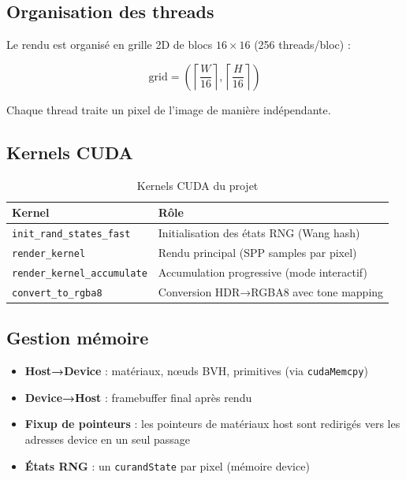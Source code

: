 \documentclass[12pt,a4paper]{article}
\begin{document}
\subsection{Organisation des threads}

Le rendu est organisé en grille 2D de blocs $16 \times 16$ (256 threads/bloc) :

\[
\text{grid} = \left(\left\lceil\frac{W}{16}\right\rceil, \left\lceil\frac{H}{16}\right\rceil\right)
\]

Chaque thread traite un pixel de l'image de manière indépendante.

\subsection{Kernels CUDA}

\begin{table}[H]
\centering
\begin{tabular}{lp{8cm}}
\toprule
\textbf{Kernel} & \textbf{Rôle} \\
\midrule
\texttt{init\_rand\_states\_fast}    & Initialisation des états RNG (Wang hash) \\
\texttt{render\_kernel}              & Rendu principal (SPP samples par pixel) \\
\texttt{render\_kernel\_accumulate}  & Accumulation progressive (mode interactif) \\
\texttt{convert\_to\_rgba8}          & Conversion HDR→RGBA8 avec tone mapping \\
\bottomrule
\end{tabular}
\caption{Kernels CUDA du projet}
\end{table}

\subsection{Gestion mémoire}

\begin{itemize}
    \item \textbf{Host→Device} : matériaux, nœuds BVH, primitives (via \texttt{cudaMemcpy})
    \item \textbf{Device→Host} : framebuffer final après rendu
    \item \textbf{Fixup de pointeurs} : les pointeurs de matériaux host sont redirigés vers
    les adresses device en un seul passage
    \item \textbf{États RNG} : un \texttt{curandState} par pixel (mémoire device)
\end{itemize}
\end{document}
